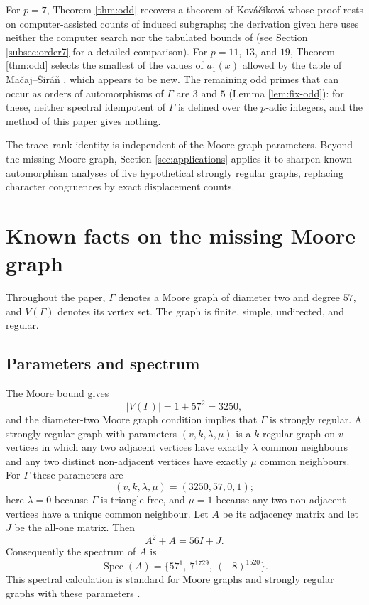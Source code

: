 \documentclass[11pt]{article}
\theoremstyle{plain}
\theoremstyle{remark}
\begin{document}
For $p=7$,
Theorem \ref{thm:odd} recovers a theorem of Kov\'a\v{c}ikov\'a \cite[Theorem 5.1]{Kovacikova} whose proof rests on computer-assisted counts of induced subgraphs;
the derivation given here uses neither the computer search nor the tabulated bounds of \cite[Lemma 12]{MacajSiran}
(see Section \ref{subsec:order7} for a detailed comparison).
For $p=11$, $13$, and $19$,
Theorem \ref{thm:odd} selects the smallest of the values of $a_1(x)$ allowed by the table of Ma\v{c}aj--\v{S}ir\'a\v{n} \cite[Lemma 12]{MacajSiran},
which appears to be new.
The remaining odd primes that can occur as orders of automorphisms of $\Gamma$ are $3$ and $5$ (Lemma \ref{lem:fix-odd}): for these,
neither spectral idempotent of $\Gamma$ is defined over the $p$-adic integers,
and the method of this paper gives nothing.

The trace--rank identity is independent of the Moore graph parameters.
Beyond the missing Moore graph,
Section \ref{sec:applications} applies it to sharpen known automorphism analyses of five hypothetical strongly regular graphs,
replacing character congruences by exact displacement counts.

\section{Known facts on the missing Moore graph}\label{sec:known}

Throughout the paper, $\Gamma$ denotes a Moore graph of diameter two and degree $57$, and $V(\Gamma)$ denotes its vertex set.
The graph is finite, simple, undirected, and regular.

\subsection{Parameters and spectrum}

The Moore bound gives
\[
 |V(\Gamma)|=1+57^2=3250,
\]
and the diameter-two Moore graph condition implies that $\Gamma$ is strongly regular.
A strongly regular graph with parameters $(v,k,\lambda,\mu)$ is a $k$-regular graph on $v$ vertices in which any two
adjacent vertices have exactly $\lambda$ common neighbours and any two distinct non-adjacent vertices have exactly $\mu$ common neighbours.
For $\Gamma$ these parameters are \cite{HoffmanSingleton,BrouwerHaemers}
\[
(v,k,\lambda,\mu)=(3250,57,0,1);
\]
here $\lambda=0$ because $\Gamma$ is triangle-free,
and $\mu=1$ because any two non-adjacent vertices have a unique common neighbour.
Let $A$ be its adjacency matrix and let $J$ be the all-one matrix.  Then
\begin{equation}\label{eq:srg-relation}
 A^2+A=56I+J.
\end{equation}
Consequently the spectrum of $A$ is
\begin{equation}\label{eq:spectrum}
 \operatorname{Spec}(A)=\{57^1,\ 7^{1729},\ (-8)^{1520}\}.
\end{equation}
This spectral calculation is standard for Moore graphs and strongly regular graphs with these parameters \cite{HoffmanSingleton,BrouwerHaemers}.
\end{document}
